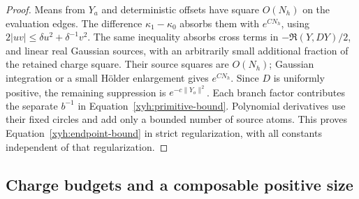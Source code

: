 \begin{proof}
Means from $Y_a$ and deterministic offsets have square $O(N_h)$ on the
evaluation edges. The difference $\kappa_1-\kappa_0$ absorbs them with
$e^{CN_h}$, using $2|uv|\le\delta u^2+\delta^{-1}v^2$. The same
inequality absorbs cross terms in $-\Re(Y,DY)/2$, and linear real
Gaussian sources, with an arbitrarily small additional fraction of the
retained charge square. Their source squares are $O(N_h)$; Gaussian
integration or a small H\"older enlargement gives $e^{CN_h}$. Since
$D$ is uniformly positive, the remaining suppression is
$e^{-c\|Y_o\|^2}$. Each branch factor contributes the separate
$b^{-1}$ in Equation~\eqref{xyh:primitive-bound}. Polynomial derivatives
use their fixed circles and add only a bounded number of source atoms.
This proves Equation~\eqref{xyh:endpoint-bound} in strict regularization,
with all constants independent of that regularization.
\end{proof}

\subsection{Charge budgets and a composable positive size}

